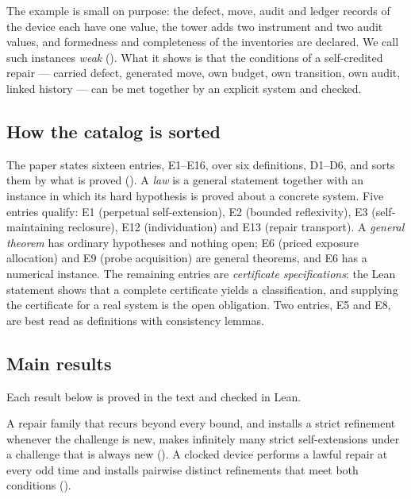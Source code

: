 The example is small on purpose: the defect, move, audit and ledger records of the device each have
one value, the tower adds two instrument and two audit values, and formedness and completeness of
the inventories are declared. We call such instances \emph{weak} ().
What it shows is that the conditions of a self-credited repair --- carried defect, generated move,
own budget, own transition, own audit, linked history --- can be met together by an explicit system
and checked.

\subsection{How the catalog is sorted}\label{sec:intro-sorting}

The paper states sixteen entries, E1--E16, over six definitions, D1--D6, and sorts them by what is
proved (). A \emph{law} is a general statement together with an instance in which
its hard hypothesis is proved about a concrete system. Five entries qualify: E1 (perpetual
self-extension), E2 (bounded reflexivity), E3 (self-maintaining reclosure), E12 (individuation) and
E13 (repair transport). A \emph{general theorem} has ordinary hypotheses and nothing open; E6 (priced
exposure allocation) and E9 (probe acquisition) are general theorems, and E6 has a numerical
instance. The remaining entries are \emph{certificate specifications}: the Lean
statement shows that a complete certificate yields a classification, and supplying the certificate
for a real system is the open obligation. Two entries, E5 and E8, are best read as definitions with
consistency lemmas.

\subsection{Main results}\label{sec:intro-results}

Each result below is proved in the text and checked in Lean.

\begin{headline}
A repair family that recurs beyond every bound, and installs a strict refinement whenever the
challenge is new, makes infinitely many strict self-extensions under a challenge that is always new
(). A clocked device performs a lawful repair at every odd time and installs
pairwise distinct refinements that meet both conditions ().
\end{headline}

